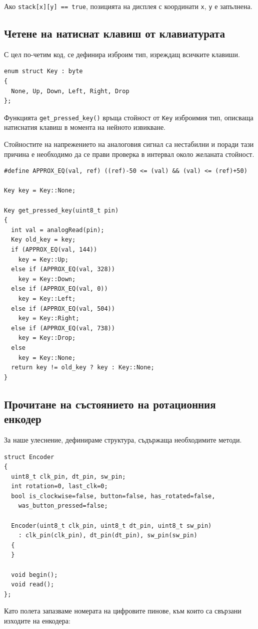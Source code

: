 \documentclass[titlepage, oneside, 12pt]{book}
\begin{document}
Ако \texttt{stack[x][y] == true}, позицията на дисплея с координати \texttt{x}, \texttt{y} е запълнена.

\subsection{Четене на натиснат клавиш от клавиатурата}

С цел по-четим код, се дефинира изброим тип, изреждащ всичките клавиши.

\begin{verbatim}
enum struct Key : byte
{
  None, Up, Down, Left, Right, Drop
};
\end{verbatim}

Функцията \texttt{get_pressed_key()} връща стойност от \texttt{Key} изброимия
тип, описваща натиснатия клавиш в момента на нейното извикване.

Стойностите на напрежението на аналоговия сигнал са нестабилни и поради тази причина е необходимо
да се прави проверка в интервал около желаната стойност.

\begin{verbatim}
#define APPROX_EQ(val, ref) ((ref)-50 <= (val) && (val) <= (ref)+50)

Key key = Key::None;

Key get_pressed_key(uint8_t pin)
{
  int val = analogRead(pin);
  Key old_key = key;
  if (APPROX_EQ(val, 144))
    key = Key::Up;
  else if (APPROX_EQ(val, 328))
    key = Key::Down;
  else if (APPROX_EQ(val, 0))
    key = Key::Left;
  else if (APPROX_EQ(val, 504))
    key = Key::Right;
  else if (APPROX_EQ(val, 738))
    key = Key::Drop;
  else
    key = Key::None;
  return key != old_key ? key : Key::None;
}
\end{verbatim}

\subsection{Прочитане на състоянието на ротационния енкодер}

За наше улеснение, дефинираме структура, съдържаща необходимите методи.

\begin{verbatim}
struct Encoder
{
  uint8_t clk_pin, dt_pin, sw_pin;
  int rotation=0, last_clk=0;
  bool is_clockwise=false, button=false, has_rotated=false,
    was_button_pressed=false;

  Encoder(uint8_t clk_pin, uint8_t dt_pin, uint8_t sw_pin)
    : clk_pin(clk_pin), dt_pin(dt_pin), sw_pin(sw_pin)
  {
  }

  void begin();
  void read();
};

\end{verbatim}
Като полета запазваме номерата на цифровите пинове, към които са свързани изходите на енкодера:
\end{document}
